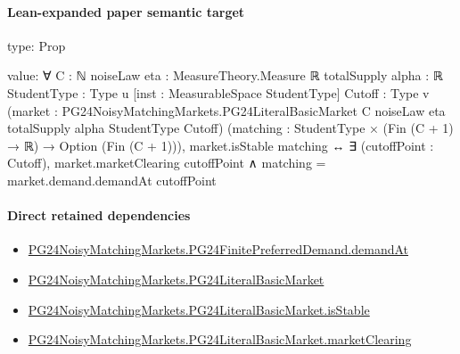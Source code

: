 \documentclass[10pt]{article}
\begin{document}
\paragraph{Lean-expanded paper semantic target}
\begin{ReviewVerbatim}
type:
Prop

value:
∀ {C : ℕ} {noiseLaw eta : MeasureTheory.Measure ℝ} {totalSupply alpha : ℝ} {StudentType : Type u}
  [inst : MeasurableSpace StudentType] {Cutoff : Type v}
  (market : PG24NoisyMatchingMarkets.PG24LiteralBasicMarket C noiseLaw eta totalSupply alpha StudentType Cutoff)
  (matching : StudentType × (Fin (C + 1) → ℝ) → Option (Fin (C + 1))),
  market.isStable matching ↔
    ∃ (cutoffPoint : Cutoff), market.marketClearing cutoffPoint ∧ matching = market.demand.demandAt cutoffPoint
\end{ReviewVerbatim}

\paragraph{Direct retained dependencies}
\begin{itemize}\raggedright
\item \hyperlink{governing-declaration-3500d2da6c6aa671}{PG24\allowbreak{}Noisy\allowbreak{}Matching\allowbreak{}Markets.\allowbreak{}PG24\allowbreak{}Finite\allowbreak{}Preferred\allowbreak{}Demand.\allowbreak{}demand\allowbreak{}At}
\item \hyperlink{paper-prerequisite-c7f1778ccec10a69}{PG24\allowbreak{}Noisy\allowbreak{}Matching\allowbreak{}Markets.\allowbreak{}PG24\allowbreak{}Literal\allowbreak{}Basic\allowbreak{}Market}
\item \hyperlink{governing-declaration-637c358c57d50458}{PG24\allowbreak{}Noisy\allowbreak{}Matching\allowbreak{}Markets.\allowbreak{}PG24\allowbreak{}Literal\allowbreak{}Basic\allowbreak{}Market.\allowbreak{}is\allowbreak{}Stable}
\item \hyperlink{governing-declaration-61d8d4911d878de6}{PG24\allowbreak{}Noisy\allowbreak{}Matching\allowbreak{}Markets.\allowbreak{}PG24\allowbreak{}Literal\allowbreak{}Basic\allowbreak{}Market.\allowbreak{}market\allowbreak{}Clearing}
\end{itemize}
\end{document}

